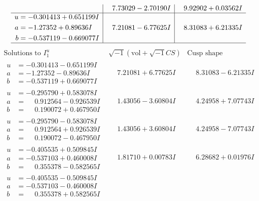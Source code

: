 \documentclass[1p]{elsarticle_modified}
\theoremstyle{definition}
\newcommand{\I}{\sqrt{-1}}
\begin{document}
$$\begin{array}{c|c|c}
 & \phantom{-}7.73029 - 2.70190 I & \phantom{-}9.92902 + 0.03562 I \\ \hline\begin{aligned}
u &= -0.301413 + 0.651199 I \\
a &= -1.27352 + 0.89636 I \\
b &= -0.537119 - 0.669077 I\end{aligned}
 & \phantom{-}7.21081 - 6.77625 I & \phantom{-}8.31083 + 6.21335 I\\
 \hline 
 \end{array}$$\newpage$$\begin{array}{c|c|c}  
\text{Solutions to }I^u_{1}& \I (\text{vol} + \sqrt{-1}CS) & \text{Cusp shape}\\
 \hline 
\begin{aligned}
u &= -0.301413 - 0.651199 I \\
a &= -1.27352 - 0.89636 I \\
b &= -0.537119 + 0.669077 I\end{aligned}
 & \phantom{-}7.21081 + 6.77625 I & \phantom{-}8.31083 - 6.21335 I \\ \hline\begin{aligned}
u &= -0.295790 + 0.583078 I \\
a &= \phantom{-}0.912564 - 0.926539 I \\
b &= \phantom{-}0.190072 + 0.467950 I\end{aligned}
 & \phantom{-}1.43056 - 3.60804 I & \phantom{-}4.24958 + 7.07743 I \\ \hline\begin{aligned}
u &= -0.295790 - 0.583078 I \\
a &= \phantom{-}0.912564 + 0.926539 I \\
b &= \phantom{-}0.190072 - 0.467950 I\end{aligned}
 & \phantom{-}1.43056 + 3.60804 I & \phantom{-}4.24958 - 7.07743 I \\ \hline\begin{aligned}
u &= -0.405535 + 0.509845 I \\
a &= -0.537103 + 0.460008 I \\
b &= \phantom{-}0.355378 - 0.582565 I\end{aligned}
 & \phantom{-}1.81710 + 0.00783 I & \phantom{-}6.28682 + 0.01976 I \\ \hline\begin{aligned}
u &= -0.405535 - 0.509845 I \\
a &= -0.537103 - 0.460008 I \\
b &= \phantom{-}0.355378 + 0.582565 I\end{aligned}

\end{array}$$
\end{document}
